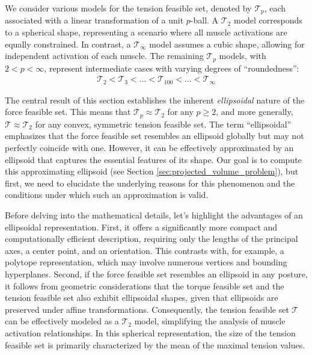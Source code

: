 We consider various models for the tension feasible set, denoted by $\mathcal{T}_p$, each associated with a linear transformation of a unit $p$-ball. A $\mathcal{T}_2$ model corresponds to a spherical shape, representing a scenario where all muscle activations are equally constrained. In contrast, a $\mathcal{T}_{\infty}$ model assumes a cubic shape, allowing for independent activation of each muscle. The remaining $\mathcal{T}_p$ models, with $2 < p < \infty$, represent intermediate cases with varying degrees of ``roundedness'':
\begin{align*}
\mathcal{T}_2 < \mathcal{T}_3 < \dots < \mathcal{T}_{100} < \dots < \mathcal{T}_{\infty}
\end{align*}

The central result of this section establishes the inherent \emph{ellipsoidal} nature of the force feasible set. This means that $\mathcal{T}_p \approx \mathcal{T}_2$ for any $p \geq 2$, and more generally, $\mathcal{T} \approx \mathcal{T}_2$ for any convex, symmetric tension feasible set. The term ``ellipsoidal'' emphasizes that the force feasible set resembles an ellipsoid globally but may not perfectly coincide with one. However, it can be effectively approximated by an ellipsoid that captures the essential features of its shape. Our goal is to compute this approximating ellipsoid (see Section \ref{sec:projected_volume_problem}), but first, we need to elucidate the underlying reasons for this phenomenon and the conditions under which such an approximation is valid.

Before delving into the mathematical details, let's highlight the advantages of an ellipsoidal representation. First, it offers a significantly more compact and computationally efficient description, requiring only the lengths of the principal axes, a center point, and an orientation. This contrasts with, for example, a polytope representation, which may involve numerous vertices and bounding hyperplanes. Second, if the force feasible set resembles an ellipsoid in any posture, it follows from geometric considerations that the torque feasible set and the tension feasible set also exhibit ellipsoidal shapes, given that ellipsoids are preserved under affine transformations. Consequently, the tension feasible set $\mathcal{T}$ can be effectively modeled as a $\mathcal{T}_2$ model, simplifying the analysis of muscle activation relationships. In this spherical representation, the size of the tension feasible set is primarily characterized by the mean of the maximal tension values.


